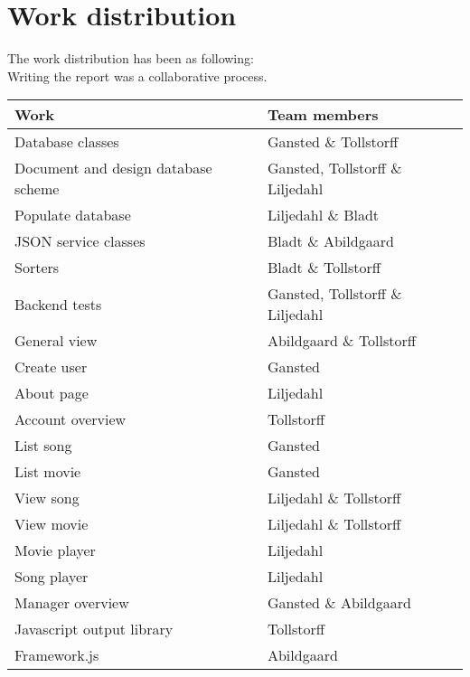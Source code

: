 \section{Work distribution}
The work distribution has been as following:\\
Writing the report was a collaborative process.

\begin{tabular} { | p{6cm} | p{6cm} | }
\hline
\textbf{Work} & \textbf{Team members} \\
\hline
Database classes & Gansted \& Tollstorff \\
\hline
Document and design database scheme & Gansted, Tollstorff \& Liljedahl \\
\hline
Populate database & Liljedahl \& Bladt \\
\hline
JSON service classes & Bladt \& Abildgaard \\
\hline
Sorters & Bladt \& Tollstorff \\
\hline
Backend tests & Gansted, Tollstorff \& Liljedahl \\
\hline
General view & Abildgaard \& Tollstorff \\
\hline
Create user & Gansted \\
\hline
About page & Liljedahl \\
\hline
Account overview & Tollstorff \\
\hline
List song & Gansted \\
\hline
List movie & Gansted \\
\hline
View song & Liljedahl \& Tollstorff \\
\hline
View movie & Liljedahl \& Tollstorff \\
\hline
Movie player & Liljedahl \\
\hline
Song player & Liljedahl \\
\hline
Manager overview & Gansted \& Abildgaard \\
\hline
Javascript output library & Tollstorff \\
\hline
Framework.js & Abildgaard \\
\hline
\end{tabular}
